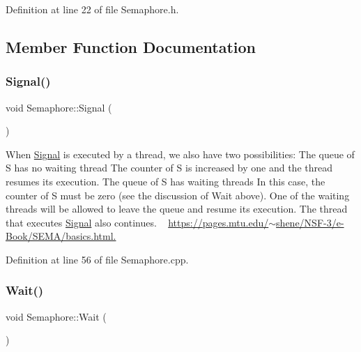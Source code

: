 Definition at line 22 of file Semaphore.\+h.



\subsection{Member Function Documentation}
\mbox{\label{class_semaphore_a86f92f738b4486439b296d8e235895f2}} 
\subsubsection{\texorpdfstring{Signal()}{Signal()}}
{\footnotesize\ttfamily void Semaphore\+::\+Signal (\begin{DoxyParamCaption}{ }\end{DoxyParamCaption})}



When \hyperlink{class_signal}{Signal} is executed by a thread, we also have two possibilities\+: The queue of S has no waiting thread The counter of S is increased by one and the thread resumes its execution. The queue of S has waiting threads In this case, the counter of S must be zero (see the discussion of Wait above). One of the waiting threads will be allowed to leave the queue and resume its execution. The thread that executes \hyperlink{class_signal}{Signal} also continues. ~\newline
\hyperlink{}{https\+://pages.\+mtu.\+edu/$\sim$shene/\+N\+S\+F-\/3/e-\/\+Book/\+S\+E\+M\+A/basics.\+html.}



Definition at line 56 of file Semaphore.\+cpp.

\mbox{\label{class_semaphore_a72aabebf026e3a8b1f3e4d0fa8ee1eda}} 
\subsubsection{\texorpdfstring{Wait()}{Wait()}\hspace{0.1cm}{\footnotesize\ttfamily [1/2]}}
{\footnotesize\ttfamily void Semaphore\+::\+Wait (\begin{DoxyParamCaption}{ }\end{DoxyParamCaption})}




